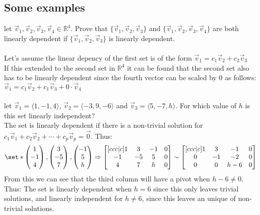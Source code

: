 \documentclass[11pt, a4paper]{article}
\begin{document}
\subsection{Some examples}
let $\vec{v}_1,\vec{v}_2,\vec{v}_3,\vec{v}_4 \in \mathbb{R}^4$. Prove that $\{\vec{v}_1,\vec{v}_2,\vec{v}_3 \}$ and $\{\vec{v}_1,\vec{v}_2,\vec{v}_3, \vec{v}_4 \}$ are both
linearly dependent if $\{ \vec{v}_1,\vec{v}_2,\vec{v}_3 \}$ is linearly dependent.\\
\\
Let's assume the linear depency of the first set is of the form $\vec{v}_1 = c_1\vec{v}_2 + c_2\vec{v}_3$\\
If this extended to the second set in $\mathbb{R}^4$ it can be found that the second set
also has to be linearly dependent since the fourth vector can be scaled by $0$ as follows: $\vec{v}_1 = c_1\vec{v}_2 + c_1\vec{v}_3 + 0 \cdot \vec{v}_4$
\\
\\
let $\vec{v}_1 = \langle 1, -1, 4 \rangle$, $\vec{v}_2 = \langle -3, 9, -6 \rangle$ and $\vec{v}_3 = \langle 5, -7, h \rangle$. For which value of $h$ is this set linearly independent?\\
The set is linearly dependent if there is a non-trivial solution for $c_1\vec{v}_1 + c_2\vec{v}_2 + \cdots + c_p\vec{v}_p = \vec{0}$.
Thus:
\begin{align*}
  \set*{\begin{pmatrix} 1\\ -1\\ 4\\ \end{pmatrix},
    \begin{pmatrix} 3\\ -5\\ 7\\ \end{pmatrix},
    \begin{pmatrix} -1\\ 5\\ h\\ \end{pmatrix}}
  \Rightarrow
  \begin{bmatrix}[ccc|c]
    1 & 3 & -1 & 0\\
    -1 & -5 & 5 & 0\\
    4 & 7 & h & 0\\
  \end{bmatrix}
  \sim
  \begin{bmatrix}[ccc|c]
    1 & 3 & -1 & 0\\
    0 & -1 & -2 & 0\\
    0 & 0 & h-6 & 0\\
  \end{bmatrix}
\end{align*}
From this we can see that the third column will have a pivot when $h - 6 \neq 0$.
Thus: The set is linearly dependent when $h=6$ since this only leaves trivial
solutions, and linearly independent for $h\neq 6$, since this leaves
an unique of non-trivial solutions.
\end{document}
